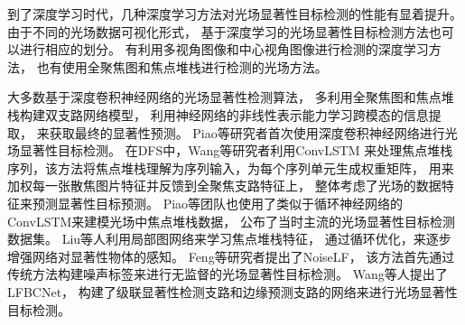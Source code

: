 


到了深度学习时代，几种深度学习方法对光场显著性目标检测的性能有显着提升。
由于不同的光场数据可视化形式，
基于深度学习的光场显著性目标检测方法也可以进行相应的划分。
有利用多视角图像和中心视角图像进行检测的深度学习方法，
也有使用全聚焦图和焦点堆栈进行检测的光场方法。



大多数基于深度卷积神经网络的光场显著性检测算法，
多利用全聚焦图和焦点堆栈构建双支路网络模型，
利用神经网络的非线性表示能力学习跨模态的信息提取，
来获取最终的显著性预测。
Piao等研究者首次使用深度卷积神经网络进行光场显著性目标检测。
在DFS中，Wang等研究者利用ConvLSTM
来处理焦点堆栈序列，该方法将焦点堆栈理解为序列输入，为每个序列单元生成权重矩阵，
用来加权每一张散焦图片特征并反馈到全聚焦支路特征上，
整体考虑了光场的数据特征来预测显著性目标预测。
Piao等团队也使用了类似于循环神经网络的ConvLSTM来建模光场中焦点堆栈数据，
公布了当时主流的光场显著性目标检测数据集。
Liu等人利用局部图网络来学习焦点堆栈特征，
通过循环优化，来逐步增强网络对显著性物体的感知。
Feng等研究者提出了NoiseLF，
该方法首先通过传统方法构建噪声标签来进行无监督的光场显著性目标检测。
Wang等人提出了LFBCNet，
构建了级联显著性检测支路和边缘预测支路的网络来进行光场显著性目标检测。








